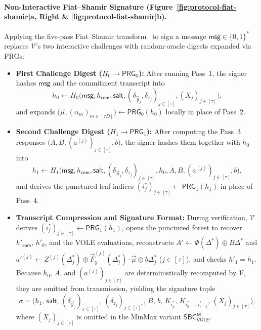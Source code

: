 \documentclass[11pt,a4paper]{article}
\theoremstyle{definition}
\theoremstyle{remark}
\newcommand{\SBCVOLEM}{\mathsf{SBC}_{\mathsf{VOLE}}^{\mathsf{M}}}
\newcommand{\salt}{\mathsf{salt}}
\newcommand{\msg}{\mathsf{msg}}
\newcommand{\com}{\mathsf{com}}
\newcommand{\PRG}{\mathsf{PRG}}
\begin{document}
\paragraph{Non-Interactive Fiat--Shamir Signature (Figure~\ref{fig:protocol-fiat-shamir}a, Right \& \ref{fig:protocol-fiat-shamir}b).}
Applying the five-pass Fiat--Shamir transform~\cite{FS86} to sign a message $\msg \in \{0,1\}^*$ replaces $\mathcal{V}$'s two interactive challenges with random-oracle digests expanded via PRGs:
\begin{itemize}[leftmargin=2em, itemsep=2.5pt]
    \item \textbf{First Challenge Digest ($H_0 \to \PRG_0$):} After running Pass~1, the signer hashes $\msg$ and the commitment transcript into
    \begin{equation}
    \label{eq:h0}
    h_0 \leftarrow H_0\big(\msg, h_{\com}, \salt, (\delta_{\vec{y}_j}, \delta_{z_j})_{j \in [\tau]}, (X_j)_{j \in [\tau]}\big),
    \end{equation}
    and expands $\big(\vec{\mu}, (\alpha_m)_{m \in [\tau D]}\big) \leftarrow \PRG_0(h_0)$ locally in place of Pass~2.
    \item \textbf{Second Challenge Digest ($H_1 \to \PRG_1$):} After computing the Pass~3 responses $\big(A, B, (a^{(j)})_{j \in [\tau]}, b\big)$, the signer hashes them together with $h_0$ into
    \begin{equation}
    \label{eq:h1}
    h_1 \leftarrow H_1\Big(\msg, h_{\com}, \salt, (\delta_{\vec{y}_j}, \delta_{z_j})_{j \in [\tau]}, h_0, A, B, (a^{(j)})_{j \in [\tau]}, b\Big),
    \end{equation}
    and derives the punctured leaf indices $(i^*_j)_{j \in [\tau]} \leftarrow \PRG_1(h_1)$ in place of Pass~4.
    \item \textbf{Transcript Compression and Signature Format:} During verification, $\mathcal{V}$ derives $(i^*_j)_{j \in [\tau]} \leftarrow \PRG_1(h_1)$, opens the punctured forest to recover $h'_{\com}$, $h'_0$, and the VOLE evaluations, reconstructs $A' \leftarrow \Phi(\Delta^*) \oplus B\Delta^*$ and $a'^{(j)} \leftarrow Z^{(j)}(\Delta^*_j) \oplus \vec{F}_y^{(j)}(\Delta^*_j) \cdot \vec{\mu} \oplus b\Delta^*_j$ ($j \in [\tau]$), and checks $h'_1 = h_1$. Because $h_0$, $A$, and $(a^{(j)})_{j \in [\tau]}$ are deterministically recomputed by $\mathcal{V}$, they are omitted from transmission, yielding the signature tuple
    \begin{equation}
    \label{eq:sigma}
    \sigma = \Big(h_1, \, \salt, \, (\delta_{\vec{y}_j})_{j \in [\tau]}, \, (\delta_{z_j})_{j \in [\tau]^*}, \, B, \, b, \, K_{i^*_{\text{p}}}, \, K_{i^*_0, \dots, i^*_{\tau-1}}, \, (X_j)_{j \in [\tau]}\Big),
    \end{equation}
    where $(X_j)_{j \in [\tau]}$ is omitted in the MinMax variant $\SBCVOLEM$.
\end{itemize}
\end{document}
